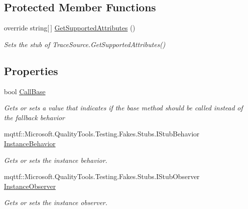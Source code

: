 \subsection*{Protected Member Functions}
\begin{DoxyCompactItemize}
\item 
override string\mbox{[}$\,$\mbox{]} \hyperlink{class_system_1_1_diagnostics_1_1_fakes_1_1_stub_trace_source_a94a921c42bc0b6d323dc2bddab9633bc}{Get\-Supported\-Attributes} ()
\begin{DoxyCompactList}\small\item\em Sets the stub of Trace\-Source.\-Get\-Supported\-Attributes()\end{DoxyCompactList}\end{DoxyCompactItemize}
\subsection*{Properties}
\begin{DoxyCompactItemize}
\item 
bool \hyperlink{class_system_1_1_diagnostics_1_1_fakes_1_1_stub_trace_source_a35842b5b0a5005bebf091a30d8b1bed3}{Call\-Base}
\begin{DoxyCompactList}\small\item\em Gets or sets a value that indicates if the base method should be called instead of the fallback behavior\end{DoxyCompactList}\item 
mqttf\-::\-Microsoft.\-Quality\-Tools.\-Testing.\-Fakes.\-Stubs.\-I\-Stub\-Behavior \hyperlink{class_system_1_1_diagnostics_1_1_fakes_1_1_stub_trace_source_a726c7440116798da3ac470fe0107f921}{Instance\-Behavior}
\begin{DoxyCompactList}\small\item\em Gets or sets the instance behavior.\end{DoxyCompactList}\item 
mqttf\-::\-Microsoft.\-Quality\-Tools.\-Testing.\-Fakes.\-Stubs.\-I\-Stub\-Observer \hyperlink{class_system_1_1_diagnostics_1_1_fakes_1_1_stub_trace_source_a2a8e7decd2bb4aac3d6e15f5011238c3}{Instance\-Observer}
\begin{DoxyCompactList}\small\item\em Gets or sets the instance observer.\end{DoxyCompactList}\end{DoxyCompactItemize}


